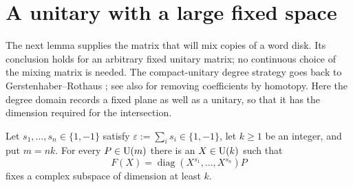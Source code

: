 \section{A unitary with a large fixed space}\label{sec:degree}

The next lemma supplies the matrix that will mix copies of a word disk.
Its conclusion holds for an arbitrary fixed unitary matrix; no continuous
choice of the mixing matrix is needed.
The compact-unitary degree strategy goes back to
Gerstenhaber--Rothaus \cite[Theorem 1]{GerstenhaberRothaus1962};
see also \cite[Section 1.1]{KlyachkoThom2017} for removing coefficients
by homotopy. Here the degree domain records a fixed plane as well as
a unitary, so that it has the dimension required for the intersection.

\begin{lemma}\label{lem:fixed}
Let $s_1,\ldots,s_n\in\{1,-1\}$ satisfy
$\varepsilon:=\sum_i s_i\in\{1,-1\}$, let $k\geq1$ be an integer,
and put $m=nk$.
For every $P\in\operatorname{U}(m)$ there is an $X\in\operatorname{U}(k)$ such that
\[
 F(X)=\operatorname{diag}(X^{s_1},\ldots,X^{s_n})P
\]
fixes a complex subspace of dimension at least $k$.
\end{lemma}

